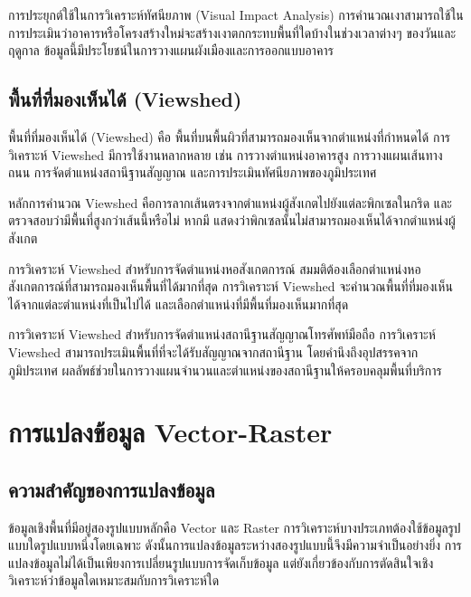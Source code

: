 \begin{ex}
การประยุกต์ใช้ในการวิเคราะห์ทัศนียภาพ (Visual Impact Analysis) การคำนวณเงาสามารถใช้ในการประเมินว่าอาคารหรือโครงสร้างใหม่จะสร้างเงาตกกระทบพื้นที่ใดบ้างในช่วงเวลาต่างๆ ของวันและฤดูกาล ข้อมูลนี้มีประโยชน์ในการวางแผนผังเมืองและการออกแบบอาคาร
\end{ex}

\subsection{พื้นที่ที่มองเห็นได้ (Viewshed)}

พื้นที่ที่มองเห็นได้ (Viewshed) คือ พื้นที่บนพื้นผิวที่สามารถมองเห็นจากตำแหน่งที่กำหนดได้ การวิเคราะห์ Viewshed มีการใช้งานหลากหลาย เช่น การวางตำแหน่งอาคารสูง การวางแผนเส้นทางถนน การจัดตำแหน่งสถานีฐานสัญญาณ และการประเมินทัศนียภาพของภูมิประเทศ

หลักการคำนวณ Viewshed คือการลากเส้นตรงจากตำแหน่งผู้สังเกตไปยังแต่ละพิกเซลในกริด และตรวจสอบว่ามีพื้นที่สูงกว่าเส้นนี้หรือไม่ หากมี แสดงว่าพิกเซลนั้นไม่สามารถมองเห็นได้จากตำแหน่งผู้สังเกต

\begin{ex}
การวิเคราะห์ Viewshed สำหรับการจัดตำแหน่งหอสังเกตการณ์ สมมติต้องเลือกตำแหน่งหอสังเกตการณ์ที่สามารถมองเห็นพื้นที่ได้มากที่สุด การวิเคราะห์ Viewshed จะคำนวณพื้นที่ที่มองเห็นได้จากแต่ละตำแหน่งที่เป็นไปได้ และเลือกตำแหน่งที่มีพื้นที่มองเห็นมากที่สุด
\end{ex}

\begin{ex}
การวิเคราะห์ Viewshed สำหรับการจัดตำแหน่งสถานีฐานสัญญาณโทรศัพท์มือถือ การวิเคราะห์ Viewshed สามารถประเมินพื้นที่ที่จะได้รับสัญญาณจากสถานีฐาน โดยคำนึงถึงอุปสรรคจากภูมิประเทศ ผลลัพธ์ช่วยในการวางแผนจำนวนและตำแหน่งของสถานีฐานให้ครอบคลุมพื้นที่บริการ
\end{ex}

\section{การแปลงข้อมูล Vector-Raster}

\subsection{ความสำคัญของการแปลงข้อมูล}
ข้อมูลเชิงพื้นที่มีอยู่สองรูปแบบหลักคือ Vector และ Raster การวิเคราะห์บางประเภทต้องใช้ข้อมูลรูปแบบใดรูปแบบหนึ่งโดยเฉพาะ ดังนั้นการแปลงข้อมูลระหว่างสองรูปแบบนี้จึงมีความจำเป็นอย่างยิ่ง การแปลงข้อมูลไม่ได้เป็นเพียงการเปลี่ยนรูปแบบการจัดเก็บข้อมูล แต่ยังเกี่ยวข้องกับการตัดสินใจเชิงวิเคราะห์ว่าข้อมูลใดเหมาะสมกับการวิเคราะห์ใด

